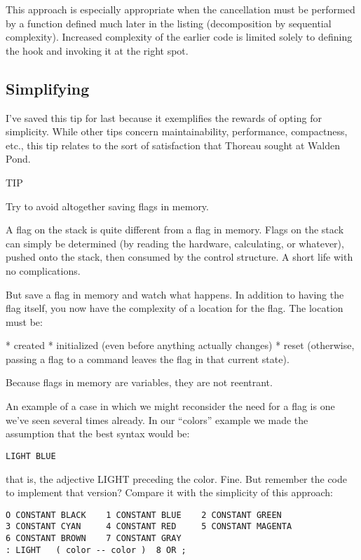 This approach is especially appropriate when the cancellation must
be performed by a function defined much later in the listing (decomposition
by sequential complexity). Increased complexity of the earlier code is
limited solely to defining the hook and invoking it at the right spot.

\subsection{Simplifying}

I've saved this tip for last because it exemplifies the rewards of opting for
simplicity. While other tips concern maintainability, performance,
compactness, etc., this tip relates to the sort of satisfaction that Thoreau
sought at Walden Pond.

TIP

Try to avoid altogether saving flags in memory.

A flag on the stack is quite different from a flag in memory. Flags on the
stack can simply be determined (by reading the hardware, calculating, or
whatever), pushed onto the stack, then consumed by the control structure.
A short life with no complications.

But save a flag in memory and watch what happens. In addition to
having the flag itself, you now have the complexity of a location for the
flag. The location must be:

* created
* initialized (even before anything actually changes)
* reset (otherwise, passing a flag to a command leaves the flag in that current
state).

Because flags in memory are variables, they are not reentrant.

An example of a case in which we might reconsider the need for a
flag is one we've seen several times already. In our ``colors'' example we
made the assumption that the best syntax would be:

\begin{verbatim}
LIGHT BLUE
\end{verbatim}

that is, the adjective LIGHT preceding the color. Fine. But remember the
code to implement that version? Compare it with the simplicity of this
approach:

\begin{verbatim}
O CONSTANT BLACK    1 CONSTANT BLUE    2 CONSTANT GREEN
3 CONSTANT CYAN     4 CONSTANT RED     5 CONSTANT MAGENTA
6 CONSTANT BROWN    7 CONSTANT GRAY
: LIGHT   ( color -- color )  8 OR ;
\end{verbatim}

